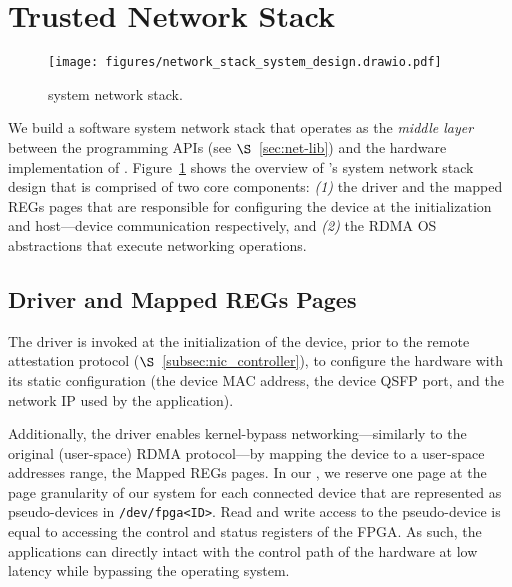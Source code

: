 \section{Trusted Network Stack}
\label{sec:t-nic-network}


\begin{figure}[t!]
    \centering
    \texttt{[image: figures/network\_stack\_system\_design.drawio.pdf]}
    \caption{\projecttitle{} system network stack.}
    \label{fig:network_stack_design}
\end{figure}


We build a software \projecttitle{} system network stack that operates as the {\em middle layer} between the \projecttitle{} programming APIs (see $\S$~\ref{sec:net-lib}) and the hardware implementation of \projecttitle{}. Figure~\ref{fig:network_stack_design} shows the overview of \projecttitle{}'s system network stack design that is comprised of two core components: {\em (1)} the \projecttitle{} driver and the mapped REGs pages that are responsible for configuring the device at the initialization and host---device communication respectively, and {\em (2)} the RDMA OS abstractions that execute networking operations. 

\subsection{\projecttitle{} Driver and Mapped REGs Pages} 

The \projecttitle{} driver is invoked at the initialization of the device, prior to the remote attestation protocol ($\S$~\ref{subsec:nic_controller}), to configure the \projecttitle{} hardware with its static configuration (the device MAC address, the device QSFP port, and the network IP used by the application). 

Additionally, the driver enables kernel-bypass networking---similarly to the original (user-space) RDMA protocol---by mapping the \projecttitle{} device to a user-space addresses range, the Mapped REGs pages. In our \projecttitle{}, we reserve one page at the page granularity of our system for each connected device that are represented as pseudo-devices in {\tt /dev/fpga<ID>}. Read and write access to the pseudo-device is equal to accessing the control and status registers of the FPGA. As such, the applications can directly intact with the control path of the \projecttitle{} hardware at low latency while bypassing the operating system. 

